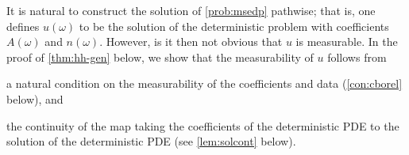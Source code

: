 %
%
%
\ere

It is natural to construct  the solution of \cref{prob:msedp} pathwise; that is, one defines $u(\omega)$ to be the solution of the deterministic problem with coefficients $A(\omega)$ and $n(\omega).$ However, is it then not obvious that $u$ is measurable.
In the proof of \cref{thm:hh-gen} below, we show that the measurability of $u$ follows from
\ben
\item a natural condition on the measurability of the coefficients and data (\cref{con:cborel} below), and 
\item the continuity of the map taking the coefficients of the deterministic PDE to the solution of the deterministic PDE (see \cref{lem:solcont} below).
  \een
\ere


